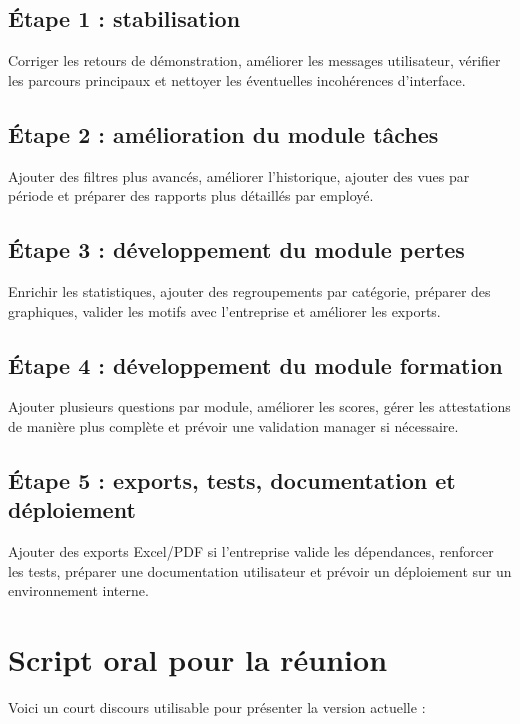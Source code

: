 \documentclass[11pt,a4paper]{article}
\begin{document}
\subsection*{Étape 1 : stabilisation}

Corriger les retours de démonstration, améliorer les messages utilisateur, vérifier les parcours principaux et nettoyer les éventuelles incohérences d'interface.

\subsection*{Étape 2 : amélioration du module tâches}

Ajouter des filtres plus avancés, améliorer l'historique, ajouter des vues par période et préparer des rapports plus détaillés par employé.

\subsection*{Étape 3 : développement du module pertes}

Enrichir les statistiques, ajouter des regroupements par catégorie, préparer des graphiques, valider les motifs avec l'entreprise et améliorer les exports.

\subsection*{Étape 4 : développement du module formation}

Ajouter plusieurs questions par module, améliorer les scores, gérer les attestations de manière plus complète et prévoir une validation manager si nécessaire.

\subsection*{Étape 5 : exports, tests, documentation et déploiement}

Ajouter des exports Excel/PDF si l'entreprise valide les dépendances, renforcer les tests, préparer une documentation utilisateur et prévoir un déploiement sur un environnement interne.

\section{Script oral pour la réunion}

Voici un court discours utilisable pour présenter la version actuelle :
\end{document}
